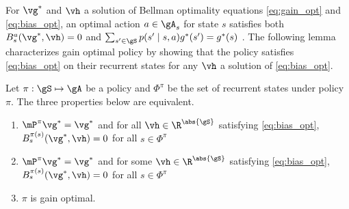 For $\vg^*$ and $\vh$ a solution of Bellman optimality equations \eqref{eq:gain_opt} and \eqref{eq:bias_opt}, %
an optimal action $a\in\gA_s$ for state $s$ satisfies both $B^a_s(\vg^*,\vh)=0$ and ${\sum_{s'\in\gS}p(s'\mid s,a)g^*(s')} =g^*(s)$ \cite{puterman2014markov, schweitzer1978functional}.
The following lemma characterizes gain optimal policy by showing that the policy satisfies \eqref{eq:bias_opt} on their recurrent states for any $\vh$ a solution of \eqref{eq:bias_opt}.
\begin{lem}
    \label{ch:mdp:lem:opt_pol}
    Let $\pi:\gS\mapsto\gA$ be a policy and $\Phi^\pi$ be the set of recurrent states under policy $\pi$.
    The three properties below are equivalent.
    \begin{enumerate}[label=(\roman*)]
        \item \label{it:opt_pol1} $\mP^\pi\vg^*=\vg^*$ and for all $\vh\in \R^{\abs{\gS}}$ satisfying \eqref{eq:bias_opt}, $B^{\pi(s)}_s(\vg^*,\vh)=0$ for all $s\in\Phi^\pi$
        \item \label{it:opt_pol2} $\mP^\pi\vg^*=\vg^*$ and for some $\vh\in \R^{\abs{\gS}}$ satisfying \eqref{eq:bias_opt}, $B^{\pi(s)}_s(\vg^*,\vh)=0$ for all $s\in\Phi^\pi$
        \item \label{it:opt_pol3} $\pi$ is gain optimal.
    \end{enumerate}
\end{lem}
